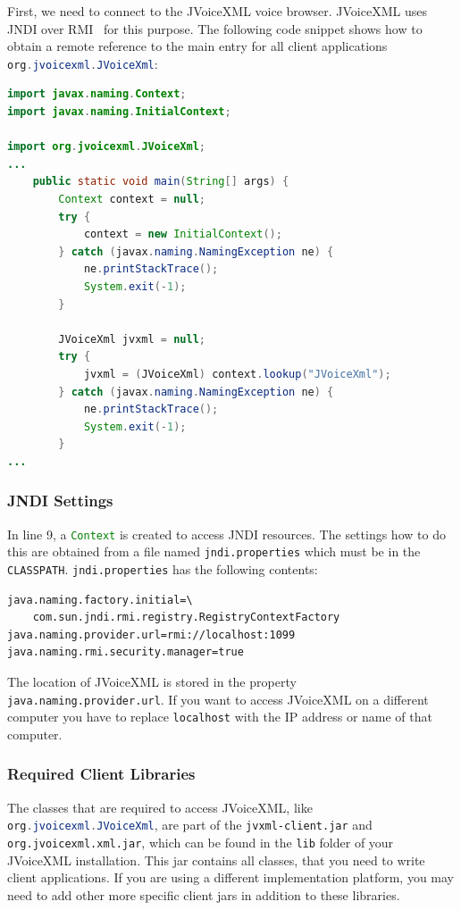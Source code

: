\documentclass[11pt,a4paper]{book}
\begin{document}
First, we need to connect to the JVoiceXML voice browser. JVoiceXML
uses JNDI over RMI~\cite{sun:rmi,sun:rmi_jndi} for this purpose. 
The following code snippet
shows how to obtain a remote reference to the main entry for
all client applications \lstinline[language=Java]{org.jvoicexml.JVoiceXml}:

\begin{lstlisting}[language=Java]
import javax.naming.Context;
import javax.naming.InitialContext;

import org.jvoicexml.JVoiceXml;
...
    public static void main(String[] args) {
        Context context = null;
        try {
            context = new InitialContext();
        } catch (javax.naming.NamingException ne) {
            ne.printStackTrace();
            System.exit(-1);
        }

        JVoiceXml jvxml = null;
        try {
            jvxml = (JVoiceXml) context.lookup("JVoiceXml");
        } catch (javax.naming.NamingException ne) {
            ne.printStackTrace();
            System.exit(-1);
        }
...
\end{lstlisting}

\subsubsection{JNDI Settings}

In line 9, a \lstinline[language=Java]{Context} is created to access JNDI resources.
The settings how to do this are obtained from a file named
\texttt{jndi.properties} which must be in the \texttt{CLASSPATH}.
\texttt{jndi.properties} has the following contents:

\begin{lstlisting}
java.naming.factory.initial=\
    com.sun.jndi.rmi.registry.RegistryContextFactory
java.naming.provider.url=rmi://localhost:1099
java.naming.rmi.security.manager=true
\end{lstlisting}

The location of JVoiceXML is stored in the property 
\texttt{java.naming.pro\-vider.url}. If you want to access JVoiceXML on a 
different computer you have to replace \texttt{localhost} with the IP address 
or name of that computer.

\subsubsection{Required Client Libraries}

The classes  that are required to access JVoiceXML, like
\lstinline[language=Java]{org.jvoicexml.JVoiceXml}, are part of the \texttt{jvxml-client.jar} and
\texttt{org.jvoicexml.xml.jar}, which can be found in the \texttt{lib} folder of
your JVoiceXML installation. This jar contains all classes, that you need to write
client applications. If you are using a different implementation platform, you
may need to add other more specific client jars in addition to these libraries.
\end{document}
